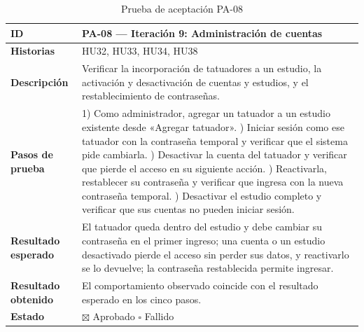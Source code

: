 \documentclass[12pt,letterpaper,oneside]{report}
\begin{document}
\begin{table}[H]
  \centering
  \caption{Prueba de aceptación PA-08}
  \label{tab:pa08anexo}
  \renewcommand{\arraystretch}{1.3}
  \small
  \begin{tabular}{|>{\raggedright\arraybackslash}p{3.6cm}|p{9.4cm}|}
    \hline
    \textbf{ID} & PA-08 — Iteración 9: Administración de cuentas \\ \hline
    \textbf{Historias} & HU32, HU33, HU34, HU38 \\ \hline
    \textbf{Descripción} & Verificar la incorporación de tatuadores a un estudio, la activación y desactivación de cuentas y estudios, y el restablecimiento de contraseñas. \\ \hline
    \textbf{Pasos de prueba} &
      1) Como administrador, agregar un tatuador a un estudio existente desde «Agregar tatuador». \newline
      2) Iniciar sesión como ese tatuador con la contraseña temporal y verificar que el sistema pide cambiarla. \newline
      3) Desactivar la cuenta del tatuador y verificar que pierde el acceso en su siguiente acción. \newline
      4) Reactivarla, restablecer su contraseña y verificar que ingresa con la nueva contraseña temporal. \newline
      5) Desactivar el estudio completo y verificar que sus cuentas no pueden iniciar sesión. \\ \hline
    \textbf{Resultado esperado} & El tatuador queda dentro del estudio y debe cambiar su contraseña en el primer ingreso; una cuenta o un estudio desactivado pierde el acceso sin perder sus datos, y reactivarlo se lo devuelve; la contraseña restablecida permite ingresar. \\ \hline
    \textbf{Resultado obtenido} & El comportamiento observado coincide con el resultado esperado en los cinco pasos. \\ \hline
    \textbf{Estado} & $\boxtimes$ Aprobado \qquad $\square$ Fallido \\ \hline
  \end{tabular}
\end{table}
\end{document}
